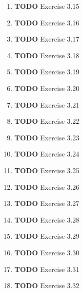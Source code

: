 \documentclass[11pt]{article}
\begin{document}
\begin{enumerate}
\begin{enumerate}
\item {\bfseries\sffamily TODO} Exercise 3.15
\label{sec:org87ad5df}

\item {\bfseries\sffamily TODO} Exercise 3.16
\label{sec:org5036b08}

\item {\bfseries\sffamily TODO} Exercise 3.17
\label{sec:orgb88d8bb}

\item {\bfseries\sffamily TODO} Exercise 3.18
\label{sec:orgad01e40}

\item {\bfseries\sffamily TODO} Exercise 3.19
\label{sec:org9364d42}

\item {\bfseries\sffamily TODO} Exercise 3.20
\label{sec:orgf66188d}

\item {\bfseries\sffamily TODO} Exercise 3.21
\label{sec:orgff5c388}

\item {\bfseries\sffamily TODO} Exercise 3.22
\label{sec:orgdecf8e9}

\item {\bfseries\sffamily TODO} Exercise 3.23
\label{sec:org4258424}

\item {\bfseries\sffamily TODO} Exercise 3.24
\label{sec:orgf410cc8}

\item {\bfseries\sffamily TODO} Exercise 3.25
\label{sec:org784240d}

\item {\bfseries\sffamily TODO} Exercise 3.26
\label{sec:orgf382149}

\item {\bfseries\sffamily TODO} Exercise 3.27
\label{sec:org70f5e88}

\item {\bfseries\sffamily TODO} Exercise 3.28
\label{sec:org9112f83}

\item {\bfseries\sffamily TODO} Exercise 3.29
\label{sec:orgd9ff5ec}

\item {\bfseries\sffamily TODO} Exercise 3.30
\label{sec:orgfd310a8}

\item {\bfseries\sffamily TODO} Exercise 3.31
\label{sec:orgcd7c43f}

\item {\bfseries\sffamily TODO} Exercise 3.32
\label{sec:org8a9873a}


\end{enumerate}
\end{enumerate}
\end{document}
